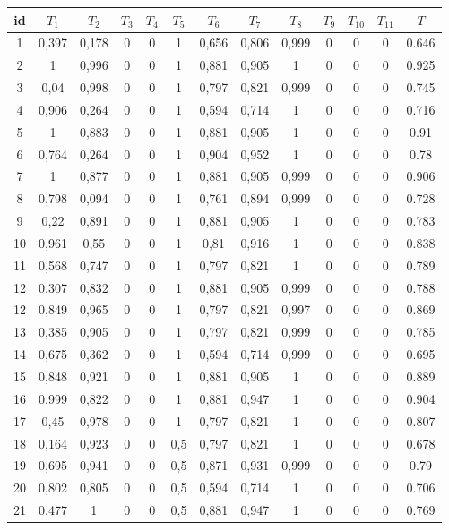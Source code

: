\documentclass{classrep}
\begin{document}
\begin{center}
  \begin{table}[H]
    \begin{tabularx}{\textwidth}{ccccccccccccc}
    
    id & $T_1$ & $T_2$ & $T_3$ & $T_4$ & $T_5$ & $T_6$ & $T_7$ & $T_8$ & $T_9$ & $T_{10}$ & $T_{11}$ & $T$ \\ \hline 

    1 &0,397 & 0,178 & 0 & 0 & 1 & 0,656 & 0,806 & 0,999 & 0 & 0 & 0 & 0.646 \\ \hline
    2 &1 & 0,996 & 0 & 0 & 1 & 0,881 & 0,905 & 1 & 0 & 0 & 0 & 0.925\\ \hline
    3 &0,04 & 0,998 & 0 & 0 & 1 & 0,797 & 0,821 & 0,999 & 0 & 0 & 0 & 0.745 \\ \hline
    4 &0,906 & 0,264 & 0 & 0 & 1 & 0,594 & 0,714 & 1 & 0 & 0 & 0 & 0.716  \\ \hline
    5 & 1 & 0,883 & 0 & 0 & 1 & 0,881 & 0,905 & 1 & 0 & 0 & 0 & 0.91   \\ \hline  
    6 & 0,764 & 0,264 & 0 & 0 & 1 & 0,904 & 0,952 & 1 & 0 & 0 & 0 & 0.78  \\ \hline  
    7 & 1 & 0,877 & 0 & 0 & 1 & 0,881 & 0,905 & 0,999 & 0 & 0 & 0 & 0.906\\ \hline 
    8 & 0,798 & 0,094 & 0 & 0 & 1 & 0,761 & 0,894 & 0,999 & 0 & 0 & 0 & 0.728 \\ \hline 
    9 & 0,22 & 0,891 & 0 & 0 & 1 & 0,881 & 0,905 & 1 & 0 & 0 & 0 & 0.783\\ \hline 
    10 & 0,961 & 0,55 & 0 & 0 & 1 & 0,81 & 0,916 & 1 & 0 & 0 & 0 & 0.838 \\ \hline 
    11 &0,568 & 0,747 & 0 & 0 & 1 & 0,797 & 0,821 & 1 & 0 & 0 & 0 & 0.789\\ \hline
    12 & 0,307 & 0,832 & 0 & 0 & 1 & 0,881 & 0,905 & 0,999 & 0 & 0 & 0 & 0.788 \\ \hline
    12 & 0,849 & 0,965 & 0 & 0 & 1 & 0,797 & 0,821 & 0,997 & 0 & 0 & 0 & 0.869 \\ \hline
    13 & 0,385 & 0,905 & 0 & 0 & 1 & 0,797 & 0,821 & 0,999 & 0 & 0 & 0 & 0.785\\ \hline
    14 & 0,675 & 0,362 & 0 & 0 & 1 & 0,594 & 0,714 & 0,999 & 0 & 0 & 0 & 0.695 \\ \hline
    15 &0,848 & 0,921 & 0 & 0 & 1 & 0,881 & 0,905 & 1 & 0 & 0 & 0 & 0.889 \\ \hline
    16 &0,999 & 0,822 & 0 & 0 & 1 & 0,881 & 0,947 & 1 & 0 & 0 & 0 & 0.904 \\ \hline
    17 & 0,45 & 0,978 & 0 & 0 & 1 & 0,797 & 0,821 & 1 & 0 & 0 & 0 & 0.807 \\ \hline
    18 & 0,164 & 0,923 & 0 & 0 & 0,5 & 0,797 & 0,821 & 1 & 0 & 0 & 0 & 0.678 \\ \hline
    19 & 0,695 & 0,941 & 0 & 0 & 0,5 & 0,871 & 0,931 & 0,999 & 0 & 0 & 0 & 0.79\\ \hline
    20 & 0,802 & 0,805 & 0 & 0 & 0,5 & 0,594 & 0,714 & 1 & 0 & 0 & 0 & 0.706\\ \hline
    21 & 0,477 & 1 & 0 & 0 & 0,5 & 0,881 & 0,947 & 1 & 0 & 0 & 0 & 0.769\\ \hline


\end{tabularx}
\end{table}
\end{center}
\end{document}
